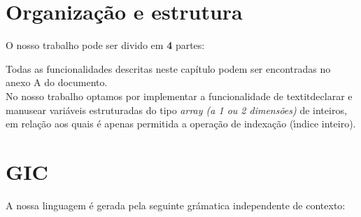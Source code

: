 \documentclass[11pt,a4paper]{report}%
\begin{document}
\section{Organização e estrutura}
O nosso trabalho pode ser divido em \textbf{4} partes:
Todas as funcionalidades descritas neste capítulo podem ser encontradas no anexo A do documento.\\
No nosso trabalho optamos por implementar a funcionalidade de textit{declarar e manusear} variáveis estruturadas do tipo \textit{array (a 1 ou 2 dimensões)} de inteiros, em relação aos quais é apenas permitida a operação de indexação (ı́ndice inteiro).\\

\section{GIC}
A nossa linguagem é gerada pela seguinte grámatica independente de contexto:
\end{document}
